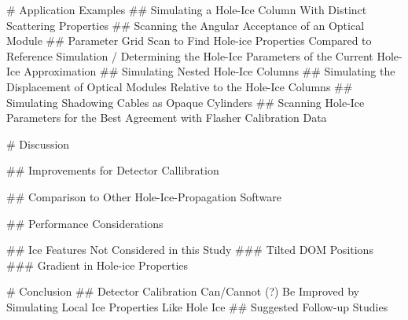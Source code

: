 
# Application Examples
## Simulating a Hole-Ice Column With Distinct Scattering Properties
## Scanning the Angular Acceptance of an Optical Module
## Parameter Grid Scan to Find Hole-ice Properties Compared to Reference Simulation / Determining the Hole-Ice Parameters of the Current Hole-Ice Approximation
## Simulating Nested Hole-Ice Columns
## Simulating the Displacement of Optical Modules Relative to the Hole-Ice Columns
## Simulating Shadowing Cables as Opaque Cylinders
## Scanning Hole-Ice Parameters for the Best Agreement with Flasher Calibration Data

# Discussion

## Improvements for Detector Callibration

## Comparison to Other Hole-Ice-Propagation Software

## Performance Considerations

## Ice Features Not Considered in this Study
### Tilted DOM Positions
### Gradient in Hole-ice Properties

# Conclusion
## Detector Calibration Can/Cannot (?) Be Improved by Simulating Local Ice Properties Like Hole Ice
## Suggested Follow-up Studies
